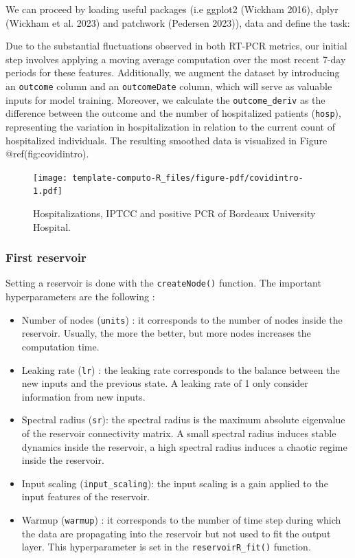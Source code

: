 \documentclass[
  11pt,
  a4paper,
]{article}
\providecommand{\tightlist}{%
  \setlength{\itemsep}{0pt}\setlength{\parskip}{0pt}}\usepackage{longtable,booktabs,array}
\theoremstyle{plain}
\theoremstyle{remark}
\begin{document}
We can proceed by loading useful packages (i.e ggplot2 (Wickham 2016),
dplyr (Wickham et al. 2023) and patchwork (Pedersen 2023)), data and
define the task:

Due to the substantial fluctuations observed in both RT-PCR metrics, our
initial step involves applying a moving average computation over the
most recent 7-day periods for these features. Additionally, we augment
the dataset by introducing an \texttt{outcome} column and an
\texttt{outcomeDate} column, which will serve as valuable inputs for
model training. Moreover, we calculate the \texttt{outcome\_deriv} as
the difference between the outcome and the number of hospitalized
patients (\texttt{hosp}), representing the variation in hospitalization
in relation to the current count of hospitalized individuals. The
resulting smoothed data is visualized in Figure @ref(fig:covidintro).

\begin{figure}[H]

{\centering \texttt{[image: template-computo-R\_files/figure-pdf/covidintro-1.pdf]}

}

\caption{Hospitalizations, IPTCC and positive PCR of Bordeaux University
Hospital.}

\end{figure}%

\subsubsection{First reservoir}\label{first-reservoir}

Setting a reservoir is done with the \texttt{createNode()} function. The
important hyperparameters are the following :

\begin{itemize}
\tightlist
\item
  Number of nodes (\texttt{units}) : it corresponds to the number of
  nodes inside the reservoir. Usually, the more the better, but more
  nodes increases the computation time.
\item
  Leaking rate (\texttt{lr}) : the leaking rate corresponds to the
  balance between the new inputs and the previous state. A leaking rate
  of 1 only consider information from new inputs.
\item
  Spectral radius (\texttt{sr}): the spectral radius is the maximum
  absolute eigenvalue of the reservoir connectivity matrix. A small
  spectral radius induces stable dynamics inside the reservoir, a high
  spectral radius induces a chaotic regime inside the reservoir.
\item
  Input scaling (\texttt{input\_scaling}): the input scaling is a gain
  applied to the input features of the reservoir.
\item
  Warmup (\texttt{warmup}) : it corresponds to the number of time step
  during which the data are propagating into the reservoir but not used
  to fit the output layer. This hyperparameter is set in the
  \texttt{reservoirR\_fit()} function.
\end{itemize}
\end{document}
